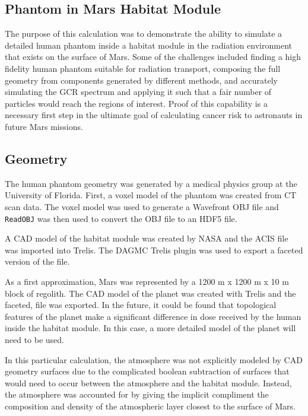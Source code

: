 
\subsection{Phantom in Mars Habitat Module}
The purpose of this calculation was to demonstrate the ability to simulate a detailed
human phantom inside a habitat module in the radiation environment that exists on the
surface of Mars.  Some of the challenges included finding a high fidelity human phantom
suitable for radiation transport, composing the full geometry from components generated
by different methods, and accurately simulating the GCR spectrum and applying it such
that a fair number of particles would reach the regions of interest. Proof of this
capability is a necessary first step in the ultimate goal of calculating cancer risk
to astronauts in future Mars missions.

\subsection*{Geometry}
The human phantom geometry was generated by a medical physics group at the University of Florida.
First, a voxel model of the phantom was created from CT scan data.  The voxel model
was used to generate a Wavefront OBJ file and \texttt{ ReadOBJ} was then used to convert
the OBJ file to an HDF5 file.  

A CAD model of the habitat module was created by NASA and the ACIS file was imported 
into Trelis.  The DAGMC Trelis plugin was used to export a faceted version of the file.

As a first approximation, Mars was represented by a 1200 m x 1200 m x 10 m block of regolith.
The CAD model of the planet was created with Trelis and the faceted,
file was exported.  In the future, it could be found that topological features of
the planet make a significant difference in dose received by the human inside the 
habitat module.  In this case, a more detailed model of the planet will need to be used.

In this particular calculation, the atmosphere was not explicitly modeled by CAD geometry
surfaces due to the complicated boolean subtraction of surfaces that would need to occur
between the atmosphere and the habitat module.  Instead, the atmosphere was accounted 
for by giving the implicit compliment the composition and density of the atmospheric layer
closest to the surface of Mars.

